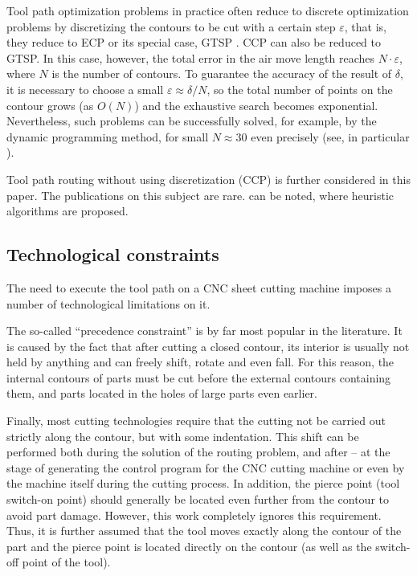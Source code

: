 \documentclass[]{interact}
\theoremstyle{plain}%
\theoremstyle{definition}
\theoremstyle{remark}
\begin{document}
Tool path optimization problems
in practice often reduce to discrete optimization problems
by discretizing the contours to be cut with a certain step
$\varepsilon$,
that is, they reduce to ECP
\cite{bi04,bi05,bi06}
or its special case, GTSP
\cite{bi07,bi08,bi09,bi10}.
CCP can also be reduced to GTSP.
In this case, however,
the total error in the air move length reaches
$N \cdot \varepsilon$,
where $N$ is the number of contours.
To guarantee the accuracy of the result of
$\delta$,
it is necessary to choose a small
$\varepsilon \approx \delta / N$,
so the total number of points on the contour grows
(as $O (N)$)
and the exhaustive search becomes exponential.
Nevertheless, such problems can be successfully solved,
for example, by the dynamic programming method,
for small
$N \approx 30$ even precisely
(see, in particular \cite{bi15}).

Tool path routing without using discretization (CCP)
is further considered in this paper.
The publications on this subject
are rare.
\cite{bi11,bi12}
can be noted,
where
heuristic algorithms are proposed.

\subsection{Technological constraints}

The need to execute the tool path on a
CNC sheet cutting machine imposes
a number of technological limitations on it.

The so-called ``precedence constraint''
is by far most popular in the literature.
It is caused by the fact that after cutting a closed contour,
its interior is usually not held by anything
and can freely shift, rotate and even fall.
For this reason,
the internal contours of parts must be cut
before the external contours containing them,
and parts located in the holes of large parts even earlier.

Finally, most cutting technologies require
that the cutting not be carried out strictly along the contour,
but with some indentation.
This shift can be performed both during the solution of the routing problem,
and after -- at the stage of generating the control program for the CNC cutting machine
or even by the machine itself during the cutting process.
In addition, the pierce point (tool switch-on point)
should generally be located even further
from the contour to avoid part damage.
However, this work completely ignores this requirement.
Thus, it is further assumed that the tool moves exactly
along the contour of the part
and the pierce point is located directly on the contour
(as well as the switch-off point of the tool).
\end{document}
